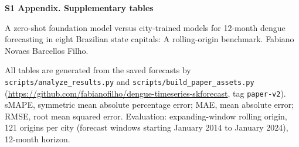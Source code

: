 \documentclass[10pt,letterpaper]{article}
\begin{document}
\raggedright
{\large \textbf{S1 Appendix. Supplementary tables}}

\medskip
A zero-shot foundation model versus city-trained models for 12-month dengue forecasting in eight Brazilian state capitals: A rolling-origin benchmark. Fabiano Novaes Barcellos Filho.

\medskip
All tables are generated from the saved forecasts by \texttt{scripts/analyze\_results.py} and \texttt{scripts/build\_paper\_assets.py} (\url{https://github.com/fabianofilho/dengue-timeseries-skforecast}, tag \texttt{paper-v2}). sMAPE, symmetric mean absolute percentage error; MAE, mean absolute error; RMSE, root mean squared error. Evaluation: expanding-window rolling origin, 121 origins per city (forecast windows starting January 2014 to January 2024), 12-month horizon.

\begin{landscape}


\end{landscape}
\end{document}
